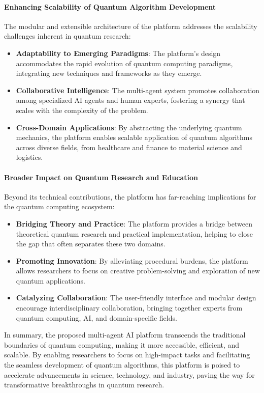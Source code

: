 \documentclass[12pt]{article}
\begin{document}
\paragraph{Enhancing Scalability of Quantum Algorithm Development}
The modular and extensible architecture of the platform addresses the scalability challenges inherent in quantum research:
\begin{itemize}
    \item \textbf{Adaptability to Emerging Paradigms}: The platform’s design accommodates the rapid evolution of quantum computing paradigms, integrating new techniques and frameworks as they emerge.
    \item \textbf{Collaborative Intelligence}: The multi-agent system promotes collaboration among specialized AI agents and human experts, fostering a synergy that scales with the complexity of the problem.
    \item \textbf{Cross-Domain Applications}: By abstracting the underlying quantum mechanics, the platform enables scalable application of quantum algorithms across diverse fields, from healthcare and finance to material science and logistics.
\end{itemize}

\paragraph{Broader Impact on Quantum Research and Education}
Beyond its technical contributions, the platform has far-reaching implications for the quantum computing ecosystem:
\begin{itemize}
    \item \textbf{Bridging Theory and Practice}: The platform provides a bridge between theoretical quantum research and practical implementation, helping to close the gap that often separates these two domains.
    \item \textbf{Promoting Innovation}: By alleviating procedural burdens, the platform allows researchers to focus on creative problem-solving and exploration of new quantum applications.
    \item \textbf{Catalyzing Collaboration}: The user-friendly interface and modular design encourage interdisciplinary collaboration, bringing together experts from quantum computing, AI, and domain-specific fields.
\end{itemize}

In summary, the proposed multi-agent AI platform transcends the traditional boundaries of quantum computing, making it more accessible, efficient, and scalable. By enabling researchers to focus on high-impact tasks and facilitating the seamless development of quantum algorithms, this platform is poised to accelerate advancements in science, technology, and industry, paving the way for transformative breakthroughs in quantum research.
\end{document}
